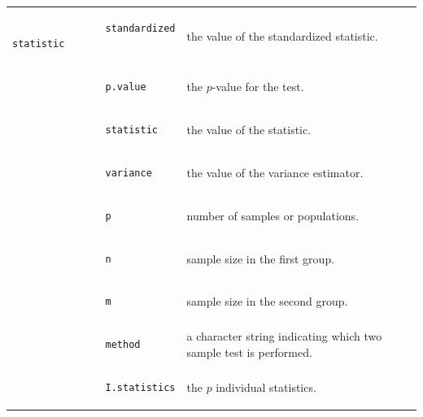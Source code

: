 \begin{table}[htb]
	\begin{center}
		\begin{tabular}{ll}
			\hline
			\hspace{-6cm}	\begin{lstlisting}	
				standardized statistic
			\end{lstlisting} &
			the value of the standardized statistic.\\
			\hspace{-6cm}	\begin{lstlisting}
				p.value
			\end{lstlisting} & the $p$-value for the test.\\
			\hspace{-6cm}	\begin{lstlisting}
				statistic
			\end{lstlisting} & the value of the statistic.\\
			\hspace{-6cm}	\begin{lstlisting}
				variance
			\end{lstlisting}& the value of the variance estimator.\\
			\hspace{-6cm}	\begin{lstlisting}
				p
			\end{lstlisting}& number of samples or populations.\\
			\hspace{-6cm}	\begin{lstlisting}
				n
			\end{lstlisting}& sample size in the first group.\\
			\hspace{-6cm}	\begin{lstlisting}
				m
			\end{lstlisting}& sample size in the second group.\\
			\hspace{-6cm}	\begin{lstlisting}
				method
			\end{lstlisting}& a character string indicating which two sample test is performed.\\
			\hspace{-6cm}	\begin{lstlisting}	
				I.statistics
			\end{lstlisting}& the $p$ individual statistics.\\

\end{tabular}
\end{center}
\end{table}
